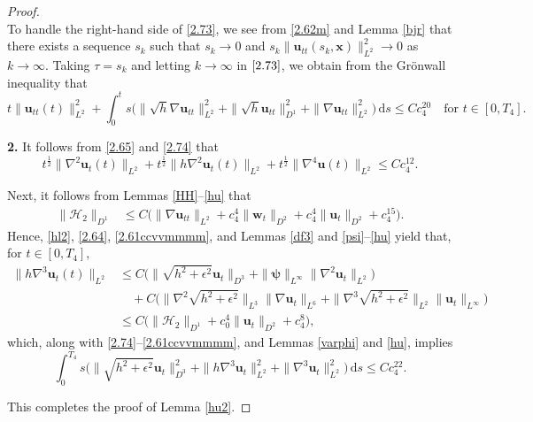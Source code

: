 \documentclass[11pt,reqno]{amsart}
\numberwithin{rk}{section}
\numberwithin{prop}{section}
\numberwithin{mydef}{section}
\numberwithin{lem}{section}
\numberwithin{equation}{section}
\numberwithin{thm}{section}
\begin{document}
\begin{proof}
\begin{equation}
\end{equation}
To handle the right-hand side of \eqref{2.73}, we see from \eqref{2.62m} and Lemma \ref{bjr} that  there exists a sequence $s_k$ such that $s_k\to 0$ and $s_k\|\boldsymbol{u}_{tt}(s_k,\boldsymbol{x})\|^2_{L^2}\to 0$ as $k\to \infty$. Taking $\tau=s_k$ and letting $k\to \infty$ in $\eqref{2.73}$, we obtain from the Gr\"onwall inequality that
\begin{equation}\label{2.74}
t\|\boldsymbol{u}_{tt}(t)\|^2_{L^2}+\int^t_0 s\big(\|\sqrt{h}\nabla \boldsymbol{u}_{tt}\|^2_{L^2}+\|\sqrt{h}\boldsymbol{u}_{tt}\|^2_{D^1}+\|\nabla \boldsymbol{u}_{tt}\|^2_{L^2}\big)\,\mathrm{d}s\leq Cc^{20}_4\quad \text{for $t\in [0,T_4]$}.
\end{equation}
 


\smallskip
\textbf{2.} It follows from \eqref{2.65}  and \eqref{2.74}  that
\begin{equation}\label{2.75}
t^{\frac{1}{2}}\|\nabla^2\boldsymbol{u}_t(t)\|_{L^2}+t^{\frac{1}{2}}\|h\nabla^2\boldsymbol{u}_t(t)\|_{L^2}+ t^{\frac{1}{2}}\|\nabla^4\boldsymbol{u}(t)\|_{L^2}\leq  Cc^{12}_4.
\end{equation}

Next, it follows from   Lemmas \ref{HH}--\ref{hu} that 
\begin{equation}\label{2.61ccvvmmmm}
\begin{aligned}
\|\mathcal{H}_2\|_{D^1}&\leq C\big(\|\nabla \boldsymbol{u}_{tt}\|_{L^2}+c^4_4\|\boldsymbol{w}_t\|_{D^2}+c^4_4\|\boldsymbol{u}_t\|_{D^2}+c^{15}_4\big).
\end{aligned}
\end{equation}
Hence, \eqref{hl2}, \eqref{2.64}, \eqref{2.61ccvvmmmm}, and Lemmas \ref{df3} and \ref{psi}--\ref{hu} yield that,  for $t\in [0,T_4]$,
\begin{equation*}
\begin{aligned}
\|h\nabla^3\boldsymbol{u}_t(t)\|_{L^2}& \leq C\big(\|\sqrt{h^2+\epsilon^2}\boldsymbol{u}_t\|_{D^3}+\|\boldsymbol{\psi}\|_{L^\infty}\|\nabla^2\boldsymbol{u}_t\|_{L^2}\big)\\
&\quad +C\big(\|\nabla^2\sqrt{h^2+\epsilon^2}\|_{L^3}\|\nabla\boldsymbol{u}_t\|_{L^6}+\|\nabla^3\sqrt{h^2+\epsilon^2}\|_{L^2}\|\boldsymbol{u}_t\|_{L^\infty}\big)\\
&\leq  C\big(\|\mathcal{H}_2\|_{D^1}+c^4_0\|\boldsymbol{u}_t\|_{D^2}+c_4^{8}\big),
\end{aligned}
\end{equation*}
which, along with \eqref{2.74}--\eqref{2.61ccvvmmmm}, and Lemmas  \ref{varphi} and \ref{hu}, implies 
\begin{equation*}\label{2.78}
\int^{T_4}_0s\big(\|\sqrt{h^2+\epsilon^2}\boldsymbol{u}_t\|_{D^3}^2+\|h\nabla^3\boldsymbol{u}_t\|_{L^2}^2+\|\nabla^3\boldsymbol{u}_t\|^2_{L^2}\big)\,\mathrm{d}s\leq Cc^{22}_4.
\end{equation*}

This completes the proof of Lemma \ref{hu2}.
\end{proof}
\end{document}
